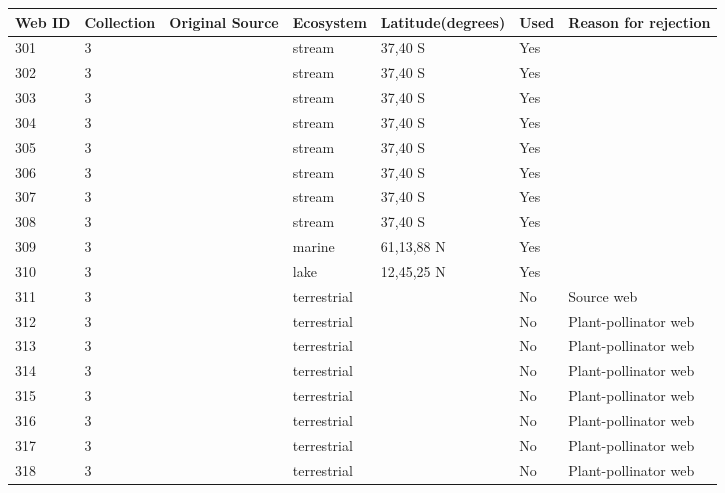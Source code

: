 \documentclass[12pt]{article}
\begin{document}
\begin{landscape}
    \begin{table}[h!]
    \centering
    {\footnotesize
      \begin{tabular}{p{2.8cm}p{1.3cm}p{3cm}p{2.2cm}p{2.5cm}lp{8.2cm}}
        \hline
        Web ID & Collection & Original Source & Ecosystem & Latitude(degrees) & Used  & Reason for rejection  \\
        \hline
        301   & 3 & \cite{Closs1994}  & stream & 37,40 S & Yes   &       \\
        302   & 3 & \cite{Closs1994}  & stream & 37,40 S & Yes   &       \\
        303   & 3 & \cite{Closs1994}  & stream & 37,40 S & Yes   &       \\
        304   & 3 & \cite{Closs1994}  & stream & 37,40 S & Yes   &       \\
        305   & 3 & \cite{Closs1994}  & stream & 37,40 S & Yes   &       \\
        306   & 3 & \cite{Closs1994}  & stream & 37,40 S & Yes   &       \\
        307   & 3 & \cite{Closs1994}  & stream & 37,40 S & Yes  &     \\
        308   & 3 & \cite{Closs1994}  & stream & 37,40 S & Yes   &       \\
        309   & 3 & \cite{Gontikaki2011}  & marine & 61,13,88 N & Yes   &       \\
        310   & 3 & \cite{Khan2009}  & lake  & 12,45,25 N & Yes   &       \\
        311   & 3 & \cite{Memmott2000}     & terrestrial &       & No    & Source web \\
        312   & 3 & \cite{Kaiser-Bunbury2009}  & terrestrial &       & No    & Plant-pollinator web \\
        313   & 3 & \cite{Kaiser-Bunbury2009}  & terrestrial &       & No    & Plant-pollinator web \\
        314   & 3 & \cite{Kaiser-Bunbury2011}  & terrestrial &       & No    & Plant-pollinator web \\
        315   & 3 & \cite{Kaiser-Bunbury2011}  & terrestrial &       & No    & Plant-pollinator web \\
        316   & 3 & \cite{Kaiser-Bunbury2011}  & terrestrial &       & No    & Plant-pollinator web \\
        317   & 3 & \cite{Kaiser-Bunbury2011}  & terrestrial &       & No    & Plant-pollinator web \\
        318   & 3 & \cite{Kaiser-Bunbury2011}  & terrestrial &       & No    & Plant-pollinator web \\

\end{tabular}}
\end{table}
\end{landscape}
\end{document}
